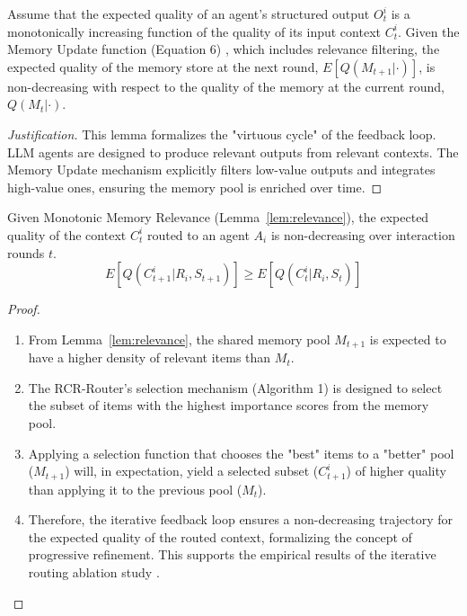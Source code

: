 \begin{lemma}
\label{lem:relevance}
Assume that the expected quality of an agent's structured output $O_t^i$ is a monotonically increasing function of the quality of its input context $C_t^i$. Given the Memory Update function (Equation 6) , which includes relevance filtering, the expected quality of the memory store at the next round, $E[Q(M_{t+1} | \cdot)]$, is non-decreasing with respect to the quality of the memory at the current round, $Q(M_t | \cdot)$.
\end{lemma}
\begin{proof}[Justification]
This lemma formalizes the "virtuous cycle" of the feedback loop. LLM agents are designed to produce relevant outputs from relevant contexts. The Memory Update mechanism  explicitly filters low-value outputs and integrates high-value ones, ensuring the memory pool is enriched over time.
\end{proof}

\begin{theorem}
\label{thm:convergence}
Given Monotonic Memory Relevance (Lemma~\ref{lem:relevance}), the expected quality of the context $C_t^i$ routed to an agent $A_i$ is non-decreasing over interaction rounds $t$.
$$ E[Q(C_{t+1}^i | R_i, S_{t+1})] \ge E[Q(C_t^i | R_i, S_t)] $$
\end{theorem}
\begin{proof}
\begin{enumerate}
    \item From Lemma~\ref{lem:relevance}, the shared memory pool $M_{t+1}$ is expected to have a higher density of relevant items than $M_t$.
    \item The RCR-Router's selection mechanism (Algorithm 1) is designed to select the subset of items with the highest importance scores from the memory pool.
    \item Applying a selection function that chooses the "best" items to a "better" pool ($M_{t+1}$) will, in expectation, yield a selected subset ($C_{t+1}^i$) of higher quality than applying it to the previous pool ($M_t$).
    \item Therefore, the iterative feedback loop ensures a non-decreasing trajectory for the expected quality of the routed context, formalizing the concept of progressive refinement. This supports the empirical results of the iterative routing ablation study .
\end{enumerate}
\end{proof}


